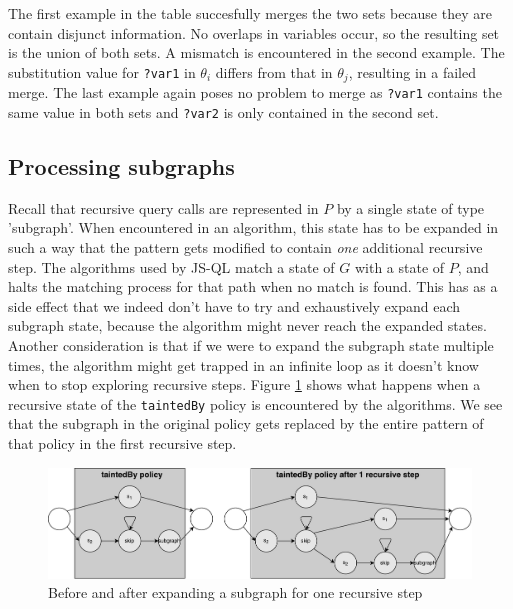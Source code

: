 \noindent The first example in the table succesfully merges the two sets because they are contain disjunct information. No overlaps in variables occur, so the resulting set is the union of both sets. A mismatch is encountered in the second example. The substitution value for \texttt{?var1} in $\theta_i$ differs from that in $\theta_j$, resulting in a failed merge. The last example again poses no problem to merge as \texttt{?var1} contains the same value in both sets and \texttt{?var2} is only contained in the second set.


\subsection{Processing subgraphs}
\label{subsec:subgraphs}

Recall that recursive query calls are represented in $P$ by a single state of type 'subgraph'. When encountered in an algorithm, this state has to be expanded in such a way that the pattern gets modified to contain \textit{one} additional recursive step. The algorithms used by JS-QL match a state of $G$ with a state of $P$, and halts the matching process for that path when no match is found. This has as a side effect that we indeed don't have to try and exhaustively expand each subgraph state, because the algorithm might never reach the expanded states. Another consideration is that if we were to expand the subgraph state multiple times, the algorithm might get trapped in an infinite loop as it doesn't know when to stop exploring recursive steps. Figure \ref{fig:subgraphExpansion} shows what happens when a recursive state of the \texttt{taintedBy} policy is encountered by the algorithms. We see that the subgraph in the original policy gets replaced by the entire pattern of that policy in the first recursive step.

\begin{figure}[!h]
    \centering
      \includegraphics[width=1\textwidth]{images/subgraphExpansion} 
      \caption{Before and after expanding a subgraph for one recursive step}
    \label{fig:subgraphExpansion}
\end{figure}

